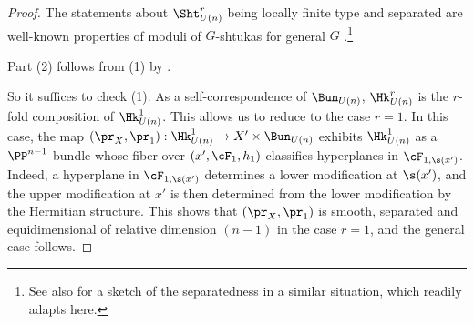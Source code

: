 \begin{proof}
The statements about $\Sht_{U(n)}^r$ being locally finite type and separated are well-known properties of moduli of $G$-shtukas for general $G$ \cite[Proposition 2.16 and Theorem 2.20]{V04}.\footnote{See also \cite[paragraph after Theorem 5.4]{YZ} for a sketch of the separatedness in a similar situation, which readily adapts here.}

Part (2) follows from (1) by \cite[Lemma 2.13]{Laff18}.

So it suffices to check (1).  As a self-correspondence of $\Bun_{U(n)}$, $\Hk^{r}_{U(n)}$ is the $r$-fold composition of $\Hk^{1}_{U(n)}$. This allows us to reduce to the case $r=1$.  In this case, the map $(\pr_{X},\pr_{1}): \Hk^{1}_{U(n)}\to X'\times\Bun_{U(n)}$ exhibits $\Hk^{1}_{U(n)}$ as a $\PP^{n-1}$-bundle whose fiber over $(x', \cF_{1},h_{1})$ classifies hyperplanes in $\cF_{1,\s(x')}$. Indeed, a hyperplane in $\cF_{1, \s(x')}$ determines a lower modification at $\s(x')$, and the upper modification at $x'$ is then determined from the lower modification by the Hermitian structure. This shows that $(\pr_{X},\pr_{1})$ is smooth, separated and equidimensional of relative dimension $(n-1)$ in the case $r=1$, and the general case follows.


\end{proof}
